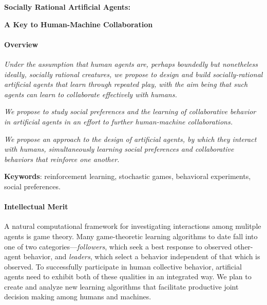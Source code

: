 
\centerline{\Large \bf Socially Rational Artificial Agents:}

\vspace{\down}
\centerline{\large \bf A Key to Human-Machine Collaboration}

\vspace{\up}
\paragraph{Overview}

\emph{Under the assumption that human agents are, perhaps boundedly but
nonetheless ideally, socially rational creatures, we propose to design
and build socially-rational artificial agents that learn through
repeated play, with the aim being that such agents can learn to
collaborate effectively with humans.}

\emph{We propose to study social preferences and the learning of
collaborative behavior in artificial agents in an effort to further
human-machine collaborations.}

\emph{We propose an approach to the design of artificial agents,
by which they interact with humans, simultaneously learning social
preferences and collaborative behaviors that reinforce one another.}


{\bf Keywords}: reinforcement learning, stochastic games, behavioral experiments, social preferences.

\vspace{\up}
\paragraph{Intellectual Merit}

A natural computational framework for investigating interactions among
mulitple agents is game theory. Many game-theoretic learning
algorithms to date fall into one of two categories---\emph{followers},
which seek a best response to observed other-agent behavior,
and \emph{leaders}, which select a behavior independent of that which
is observed. To successfully participate in human collective behavior,
artificial agents need to exhibit both of these qualities in an
integrated way. We plan to create and analyze new learning algorithms
that facilitate productive joint decision making among humans and
machines.

